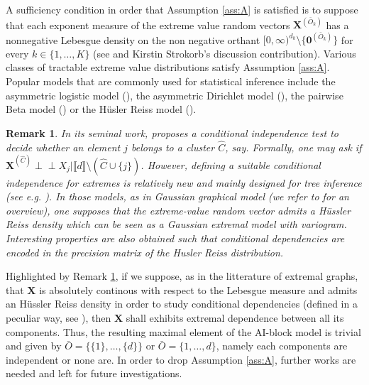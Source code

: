 \documentclass[11pt]{article}
\newtheorem{remark}{Remark}
\newcommand{\indep}{\perp \!\!\! \perp}
\begin{document}
	A sufficiency condition in order that Assumption \ref{ass:A} is satisfied is to suppose that each exponent measure of the extreme value random vectors $\textbf{X}^{(\bar{O}_k)}$ has a nonnegative Lebesgue density on the non negative orthant $[0,\infty)^{d_k} \setminus \{\textbf{0}^{(\bar{O}_k)}\}$ for every $k \in \{1, \dots, K\}$ (see \cite{engelke2020graphical} and Kirstin Strokorb's discussion contribution). Various classes of tractable extreme value distributions satisfy Assumption \ref{ass:A}. Popular models that are commonly used for statistical inference include the asymmetric logistic model (\cite{10.1093/biomet/77.2.245}), the asymmetric Dirichlet model (\cite{10.2307/2345748}), the pairwise Beta model (\cite{COOLEY20102103}) or the Hüsler Reiss model (\cite{HUSLER1989283}).
	\begin{remark}
		\label{rem:tree_model}
		In its seminal work, \cite{NIPS2017_37d097ca} proposes a conditional independence test to decide whether an element $j$ belongs to a cluster $\hat{C}$, say. Formally, one may ask if $\textbf{X}^{(\hat{C})} \indep X_j | \llbracket d \rrbracket \setminus (\hat{C} \cup \{j\})$. However, defining a suitable conditional independence for extremes is relatively new and mainly designed for tree inference (see \emph{e.g.} \cite{engelke2020graphical, asenova2021inference, segers2020one, engelke2020structure}). In those models, as in Gaussian graphical model (we refer to \cite{lauritzen1996graphical} for an overview), one supposes that the extreme-value random vector admits a Hüssler Reiss density which can be seen as a Gaussian extremal model with variogram. Interesting properties are also obtained such that conditional dependencies are encoded in the precision matrix of the Husler Reiss distribution.
	\end{remark}
	Highlighted by Remark \ref{rem:tree_model}, if we suppose, as in the litterature of extremal graphs, that $\textbf{X}$ is absolutely continous with respect to the Lebesgue measure and admits an Hüssler Reiss density in order to study conditional dependencies (defined in a peculiar way, see \cite{engelke2020graphical}), then $\textbf{X}$ shall exhibits extremal dependence between all its components. Thus, the resulting maximal element of the AI-block model is trivial and given by $\bar{O} = \{ \{1\}, \dots, \{d\}\}$ or $\bar{O} = \{ 1,\dots,d\}$, namely each components are independent or none are. In order to drop Assumption \ref{ass:A}, further works are needed and left for future investigations.
	
\end{document}
